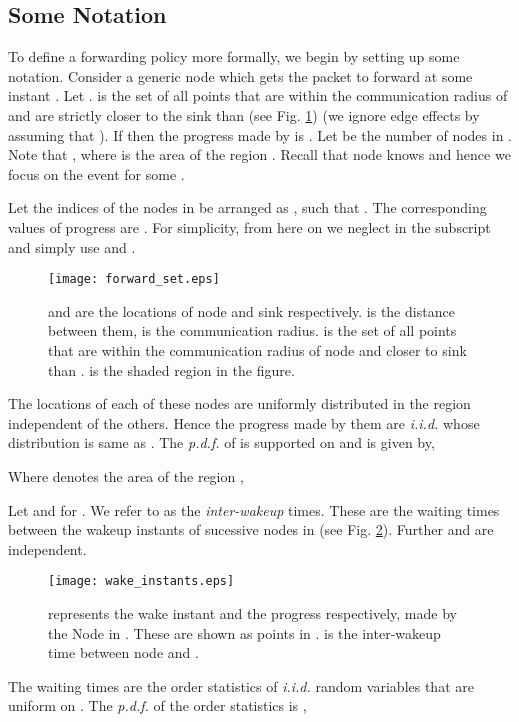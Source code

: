 \documentclass[onecolumn]{IEEEtran}
\begin{document}
\subsection{Some Notation}
\label{notation_sec}
To define a forwarding policy more formally, we begin by setting up
some notation. Consider a generic node  which gets the packet to
forward at some instant . Let .   is the set of all points that are
within the communication radius of  and are strictly closer to the
sink than  (see Fig. \ref{forwardset_figu}) (we ignore edge effects
by assuming that ).  If
 then the progress made by  is .
Let  be the number of nodes in . Note that
, where  is
the area of the region . Recall that node  knows
 and hence we focus on the event  for some .

Let the indices of the nodes in  be arranged as
, such that .  The corresponding values of progress are
. For simplicity, from here on we
neglect  in the subscript and simply use 
and .
\begin{figure}[ht]
\centering
\texttt{[image: forward\_set.eps]}
\caption{ and  are the locations of node  and sink
  respectively.  is the distance between them,  is the
  communication radius.   is the set of all points that
  are within the communication radius of node  and closer to sink
  than .  is the shaded region in the figure.
  \label{forwardset_figu}}
\end{figure}

The locations of each of these  nodes are uniformly distributed in
the region  independent of the others. Hence the
progress made by them are \emph{i.i.d.} whose distribution is same as .
The \emph{p.d.f.} of  is supported on  and is given by,

Where  denotes the area of the region , 


Let  and  for . We refer to  as the \emph{inter-wakeup} times. These are
the waiting times between the wakeup instants of sucessive nodes in
 (see Fig. \ref{wakeinstants_figu}). Further  and  are independent.
\begin{figure}[ht]
\centering
\texttt{[image: wake\_instants.eps]}
\caption{ represents the wake instant and the
  progress respectively, made by the Node  in .
  These are shown as points in .  is the
  inter-wakeup time between node  and
  .\label{wakeinstants_figu}}
\end{figure}
 
The waiting times   are the order
statistics of  \emph{i.i.d.} random variables that are uniform on .
The \emph{p.d.f.} of the  order statistics is \cite[Chapter
2]{orderstatistics},
\end{document}
